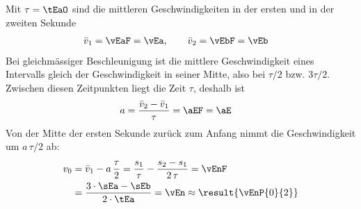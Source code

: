 Mit $\tau = \tEaO$ sind die mittleren Geschwindigkeiten in der ersten und in der zweiten Sekunde
\begin{align}
 \bar v_1 &= \vEaF = \vEa, \qquad \bar v_2 = \vEbF = \vEb
\end{align}
Bei gleichmässiger Beschleunigung ist die mittlere Geschwindigkeit eines Intervalls gleich der Geschwindigkeit in seiner Mitte, also bei $\tau/2$ bzw. $3\tau/2$. Zwischen diesen Zeitpunkten liegt die Zeit $\tau$, deshalb ist
\begin{align}
 a &= \frac{\bar v_2-\bar v_1}{\tau} = \aEF = \aE
\end{align}
Von der Mitte der ersten Sekunde zurück zum Anfang nimmt die Geschwindigkeit um $a\,\tau/2$ ab:
\begin{align}
 v_0 &= \bar v_1 - a\,\frac{\tau}{2} = \frac{s_1}{\tau}-\frac{s_2-s_1}{2\,\tau} = \vEnF \\
   &= \frac{3\cdot\sEa-\sEb}{2\cdot\tEa} = \vEn \approx \result{\vEnP{0}{2}}
\end{align}
